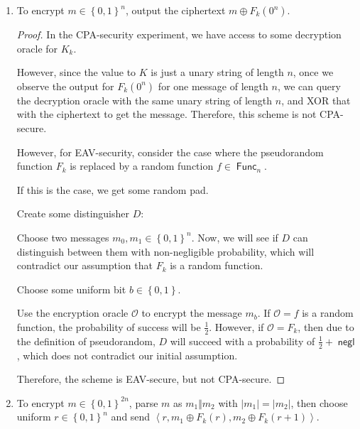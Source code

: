 \documentclass{article}
\DeclareMathOperator{\Func}{\textsf{Func}}
\DeclareMathOperator{\negl}{\textsf{negl}}
\begin{document}
\begin{enumerate}
\begin{enumerate}
        \item To encrypt $m \in \left\{0, 1\right\}^n$, output the ciphertext $m
          \oplus F_k(0^n)$.

          \begin{proof}
            In the CPA-security experiment, we have access to some decryption
            oracle for $K_k$.

            However, since the value to $K$ is just a unary string of length
            $n$, once we observe the output for $F_k(0^n)$ for one message of
            length $n$, we can query the decryption oracle with the same unary
            string of length $n$, and XOR that with the ciphertext to get the
            message. Therefore, this scheme is not CPA-secure.

            However, for EAV-security, consider the case where the pseudorandom
            function $F_k$ is replaced by a random function $f \in \Func_n$.

            If this is the case, we get some random pad.

            Create some distinguisher $D$:

            Choose two messages $m_0, m_1 \in \left\{0, 1\right\}^n$. Now, we
            will see if $D$ can distinguish between them with non-negligible
            probability, which will contradict our assumption that $F_k$ is a
            random function.

            Choose some uniform bit $b \in \left\{0, 1\right\}$.

            Use the encryption oracle $\mathcal{O}$ to encrypt the message
            $m_b$. If $\mathcal{O} = f$ is a random function, the probability of
            success will be $\frac{1}{2}$. However, if $\mathcal{O} = F_k$, then
            due to the definition of pseudorandom, $D$ will succeed with a
            probability of $\frac{1}{2} + \negl$, which does not contradict our
            initial assumption.

            Therefore, the scheme is EAV-secure, but not CPA-secure.
          \end{proof}

        \item To encrypt $m \in \left\{0, 1\right\}^{2n}$, parse $m$ as $m_1
          \Vert m_2$ with $| m_1 | = | m_2 |$, then choose uniform
          $r \in \left\{0, 1\right\}^n$ and send $\left\langle r, m_1 \oplus
          F_k(r), m_2 \oplus F_k(r + 1)\right\rangle$.


\end{enumerate}
\end{enumerate}
\end{document}
